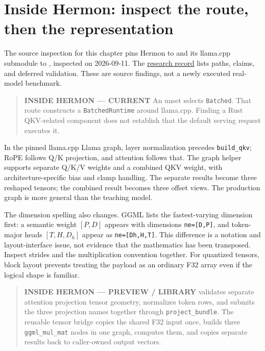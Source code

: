 \section{Inside Hermon: inspect the route, then the
representation}\label{inside-hermon-inspect-the-route-then-the-representation}


The source inspection for this chapter pins Hermon to
\texttt{} and its
llama.cpp submodule to
\texttt{}, inspected
on 2026-09-11. The
\href{https://github.com/hermonai/inside-the-llm-engine/blob/astra-visual-rewrite/research/part-02/chapter-08-queries-keys-and-values.md}{research
record} lists paths, claims, and deferred validation. These are source
findings, not a newly executed real-model benchmark.

\begin{quote}
\textbf{INSIDE HERMON --- CURRENT} An unset
\texttt{} selects \texttt{Batched}. That
route constructs a \texttt{BatchedRuntime} around llama.cpp. Finding a
Rust QKV-related component does not establish that the default serving
request executes it.
\end{quote}

In the pinned llama.cpp Llama graph, layer normalization precedes
\texttt{build\_qkv}; RoPE follows Q/K projection, and attention follows
that. The graph helper supports separate Q/K/V weights and a combined
QKV weight, with architecture-specific bias and clamp handling. The
separate results become three reshaped tensors; the combined result
becomes three offset views. The production graph is more general than
the teaching model.

The dimension spelling also changes. GGML lists the fastest-varying
dimension first: a semantic weight \([P,D]\) appears with dimensions
\texttt{ne={[}D,P{]}}, and token-major heads \([T,H,D_h]\) appear as
\texttt{ne={[}Dh,H,T{]}}. This difference is a notation and
layout-interface issue, not evidence that the mathematics has been
transposed. Inspect strides and the multiplication convention together.
For quantized tensors, block layout prevents treating the payload as an
ordinary F32 array even if the logical shape is familiar.

\begin{quote}
\textbf{INSIDE HERMON --- PREVIEW / LIBRARY}
\texttt{} validates separate attention
projection tensor geometry, normalizes token rows, and submits the three
projection names together through \texttt{project\_bundle}. The reusable
tensor bridge copies the shared F32 input once, builds three
\texttt{ggml\_mul\_mat} nodes in one graph, computes them, and copies
separate results back to caller-owned output vectors.
\end{quote}

